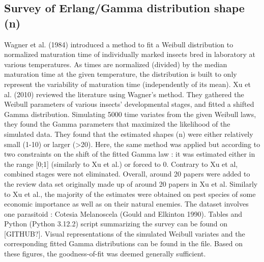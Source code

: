 \documentclass[12pt,a4paper,onecolumn]{article}
\begin{document}
\subsection{Survey of Erlang/Gamma distribution shape (n)}
\tabto{1 cm} Wagner et al. (1984) introduced a method to fit a Weibull distribution to normalized maturation time of individually marked insects bred in laboratory at various temperatures. As times are normalized (divided) by the median maturation time at the given temperature, the distribution is built to only represent the variability of maturation time (independently of its mean). Xu et al. (2010) reviewed the literature using Wagner's method. They gathered the Weibull parameters of various insects' developmental stages, and fitted a shifted Gamma distribution. Simulating 5000 time variates from the given Weibull laws, they found the Gamma parameters that maximized the likelihood of the simulated data. They found that the estimated shapes (n) were either relatively small (1-10) or larger (>20). Here, the same method was applied but according to two constraints on the shift of the fitted Gamma law : it was estimated either in the range [0;1] (similarly to Xu et al.) or forced to 0. Contrary to Xu et al, combined stages were not eliminated. Overall, around 20 papers were added to the review data set originally made up of around 20 papers in Xu et al. Similarly to Xu et al., the majority of the estimates were obtained on pest species of some economic importance as well as on their natural enemies. The dataset involves one parasitoid : Cotesia Melanoscela (Gould and Elkinton 1990). Tables and Python (Python 3.12.2) script summarizing the survey can be found on [GITHUB?]. Visual representations of the simulated Weibull variates and the corresponding fitted Gamma distributions can be found in the file. Based on these figures, the goodness-of-fit was deemed generally sufficient.
\end{document}
